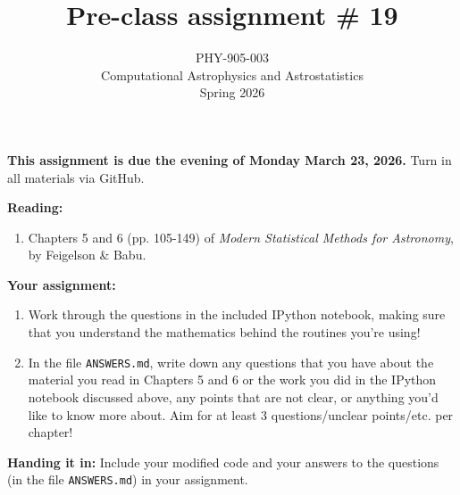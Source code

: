 \documentclass[10pt]{article}
\title{Pre-class assignment \# 19}
\author{PHY-905-003\\Computational Astrophysics and
  Astrostatistics\\Spring 2026}
\date{} %
\begin{document}
 
\maketitle

\vspace{-10mm}

\noindent
\textbf{This assignment is due the evening of Monday March 23, 2026.}
 Turn in all materials via GitHub.

\vspace{5mm}

\noindent
\textbf{Reading:}

\begin{enumerate}

\item Chapters 5 and 6 (pp. 105-149) of \textit{Modern Statistical
    Methods for Astronomy},
  by Feigelson \& Babu.

\end{enumerate}

\noindent
\textbf{Your assignment:}

\begin{enumerate}

\item Work through the questions in the included IPython notebook,
making sure that you understand the mathematics behind the routines
you're using!

\item In the file \texttt{ANSWERS.md}, write down any questions that
you have about the material you read in Chapters 5 and 6 or the work
you did in the IPython notebook discussed above, any points that are
not clear, or anything you'd like to know more about.  Aim for at
least 3 questions/unclear points/etc. per chapter!

\end{enumerate}

\noindent \textbf{Handing it in:} Include your modified code and
your answers to the questions (in the file \texttt{ANSWERS.md})
in your assignment.
\end{document}
